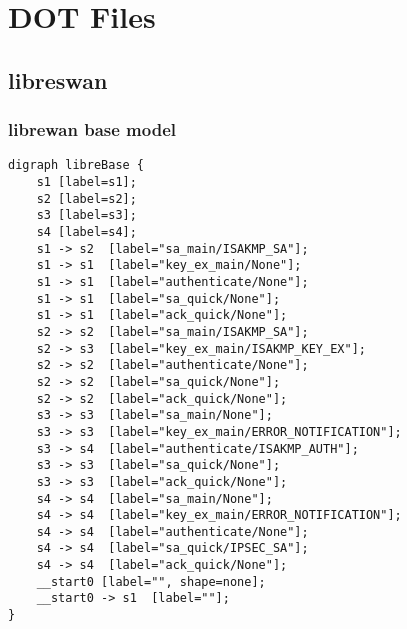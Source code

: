 %
%
% 

\chapter{DOT Files}

\label{app::dot}

\section*{libreswan}
\subsection*{librewan base model}

\begin{lstlisting}[numbers=none]
digraph libreBase {
	s1 [label=s1];
	s2 [label=s2];
	s3 [label=s3];
	s4 [label=s4];
	s1 -> s2  [label="sa_main/ISAKMP_SA"];
	s1 -> s1  [label="key_ex_main/None"];
	s1 -> s1  [label="authenticate/None"];
	s1 -> s1  [label="sa_quick/None"];
	s1 -> s1  [label="ack_quick/None"];
	s2 -> s2  [label="sa_main/ISAKMP_SA"];
	s2 -> s3  [label="key_ex_main/ISAKMP_KEY_EX"];
	s2 -> s2  [label="authenticate/None"];
	s2 -> s2  [label="sa_quick/None"];
	s2 -> s2  [label="ack_quick/None"];
	s3 -> s3  [label="sa_main/None"];
	s3 -> s3  [label="key_ex_main/ERROR_NOTIFICATION"];
	s3 -> s4  [label="authenticate/ISAKMP_AUTH"];
	s3 -> s3  [label="sa_quick/None"];
	s3 -> s3  [label="ack_quick/None"];
	s4 -> s4  [label="sa_main/None"];
	s4 -> s4  [label="key_ex_main/ERROR_NOTIFICATION"];
	s4 -> s4  [label="authenticate/None"];
	s4 -> s4  [label="sa_quick/IPSEC_SA"];
	s4 -> s4  [label="ack_quick/None"];
	__start0 [label="", shape=none];
	__start0 -> s1  [label=""];
}
\end{lstlisting}
\newpage


